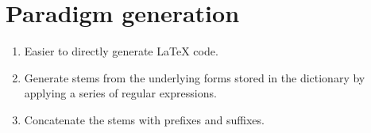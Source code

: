 \documentclass[oldfontcommands,oneside,a4paper,11pt]{article}
\begin{document}
\section{Paradigm generation}
\begin{enumerate}
\item Easier to directly generate \LaTeX{} code.
\item Generate stems from the underlying forms stored in the dictionary by applying a series of regular expressions.
\item Concatenate the stems with prefixes and suffixes.
\end{enumerate}



\end{document}
